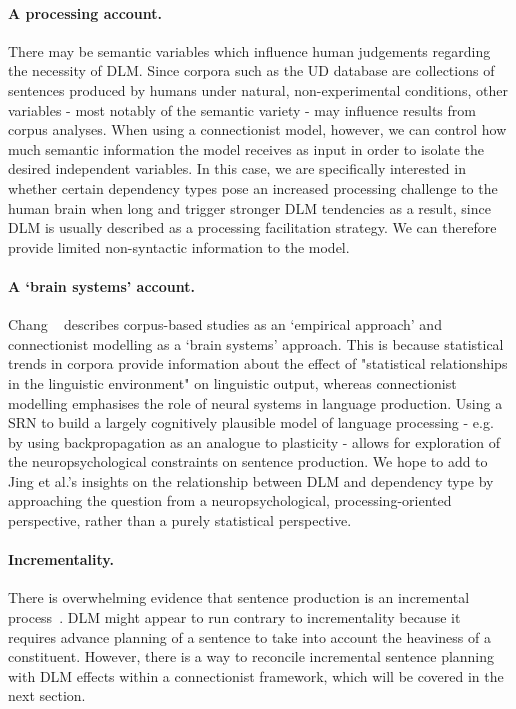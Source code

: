 \documentclass{article}
\begin{document}
\paragraph{A processing account.} There may be semantic variables which influence human judgements regarding the necessity of DLM. Since corpora such as the UD database are collections of sentences produced by humans under natural, non-experimental conditions, other variables - most notably of the semantic variety - may influence results from corpus analyses. When using a connectionist model, however, we can control how much semantic information the model receives as input in order to isolate the desired independent variables. In this case, we are specifically interested in whether certain dependency types pose an increased processing challenge to the human brain when long and trigger stronger DLM tendencies as a result, since DLM is usually described as a processing facilitation strategy. We can therefore provide limited non-syntactic information to the model.
\paragraph{A `brain systems' account.} Chang ~\cite{chang2014} describes corpus-based studies as an `empirical approach' and connectionist modelling as a `brain systems' approach. This is because statistical trends in corpora provide information about the effect of "statistical relationships in the linguistic environment" on linguistic output, whereas connectionist modelling emphasises the role of neural systems in language production. Using a SRN to build a largely cognitively plausible model of language processing - e.g. by using backpropagation as an analogue to plasticity - allows for exploration of the neuropsychological constraints on sentence production. We hope to add to Jing et al.'s insights on the relationship between DLM and dependency type by approaching the question from a neuropsychological, processing-oriented perspective, rather than a purely statistical perspective. 
\paragraph{Incrementality.} There is overwhelming evidence that sentence production is an incremental process~\cite{dijkstra1996}. DLM might appear to run contrary to incrementality because it requires advance planning of a sentence to take into account the heaviness of a constituent. However, there is a way to reconcile incremental sentence planning with DLM effects within a connectionist framework, which will be covered in the next section. 
\end{document}
